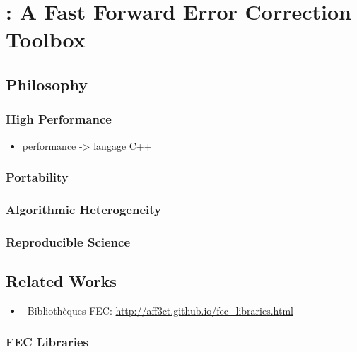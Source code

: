 \graphicspath{{main/chapter4/fig/}}

\chapter{\AFFECT: A Fast Forward Error Correction Toolbox}

\minitoccustom

\section{Philosophy}

\subsection{High Performance}

\begin{itemize}
  \item performance -> langage C++
\end{itemize}

\subsection{Portability}

\subsection{Algorithmic Heterogeneity}

\subsection{Reproducible Science}

\section{Related Works}

\begin{itemize}
  \item \cmark~Bibliothèques FEC: \url{http://aff3ct.github.io/fec_libraries.html}
\end{itemize}

\subsection{FEC Libraries}

